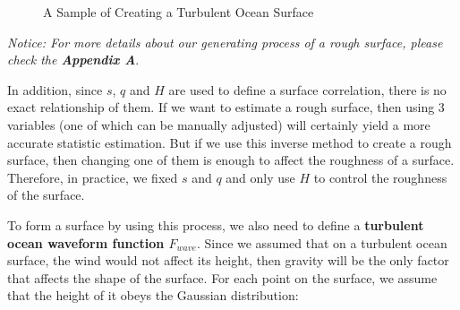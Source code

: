 \documentclass{mcmthesis}
\begin{document}
      \begin{figure}[!t]
            \centering
            \caption{A Sample of Creating a Turbulent Ocean Surface}
            \label{fig:sample_ocean}
      \end{figure}

    \emph{Notice: For more details about our generating process of a rough surface, please check the \textbf{Appendix A}}.

    In addition, since $s$, $q$ and $H$ are used to define a surface correlation, there is no exact relationship of them. If we want to estimate a rough surface, then using 3 variables (one of which can be manually adjusted) will certainly yield a more accurate statistic estimation. But if we use this inverse method to create a rough surface, then changing one of them is enough to affect the roughness of a surface. Therefore, in practice, we fixed $s$ and $q$ and only use $H$ to control the roughness of the surface.

    To form a surface by using this process, we also need to define a \textbf{turbulent ocean waveform function $F_{wave}$}. Since we assumed that on a turbulent ocean surface, the wind would not affect its height, then gravity will be the only factor that affects the shape of the surface. For each point on the surface, we assume that the height of it obeys the Gaussian distribution:
\end{document}

